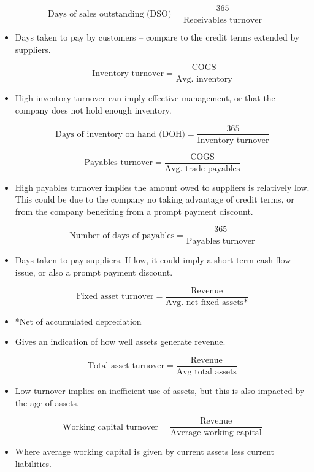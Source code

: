 \documentclass[../notes_compiled.tex]{subfiles}
\begin{document}
\begin{equation*}
\text{Days of sales outstanding (DSO)} = \frac{365}{\text{Receivables turnover}}
\end{equation*}
\begin{itemize}
\item Days taken to pay by customers -- compare to the credit terms extended by suppliers.

\begin{equation*}
\text{Inventory turnover} = \frac{\text{COGS}}{\text{Avg. inventory}}
\end{equation*}
\item High inventory turnover can imply effective management, or that the company does not hold enough inventory.

\begin{equation*}
\text{Days of inventory on hand (DOH)} = \frac{365}{\text{Inventory turnover}}
\end{equation*}

\begin{equation*}
\text{Payables turnover} = \frac{\text{COGS}}{\text{Avg. trade payables}}
\end{equation*}
\item High payables turnover implies the amount owed to suppliers is relatively low. This could be due to the company no taking advantage of credit terms, or from the company benefiting from a prompt payment discount.

\begin{equation*}
\text{Number of days of payables} = \frac{365}{\text{Payables turnover}}
\end{equation*}
\item Days taken to pay suppliers. If low, it could imply a short-term cash flow issue, or also a prompt payment discount.

\begin{equation*}
\text{Fixed asset turnover} = \frac{\text{Revenue}}{\text{Avg. net fixed assets*}}
\end{equation*}
\item[] *Net of accumulated depreciation
\item Gives an indication of how well assets generate revenue.

\begin{equation*}
\text{Total asset turnover} = \frac{\text{Revenue}}{\text{Avg total assets}}
\end{equation*}
\item Low turnover implies an inefficient use of assets, but this is also impacted by the age of assets.

\begin{equation*}
\text{Working capital turnover} = \frac{\text{Revenue}}{\text{Average working capital}}
\end{equation*}
\item Where average working capital is given by current assets less current liabilities.


\end{itemize}
\end{document}
